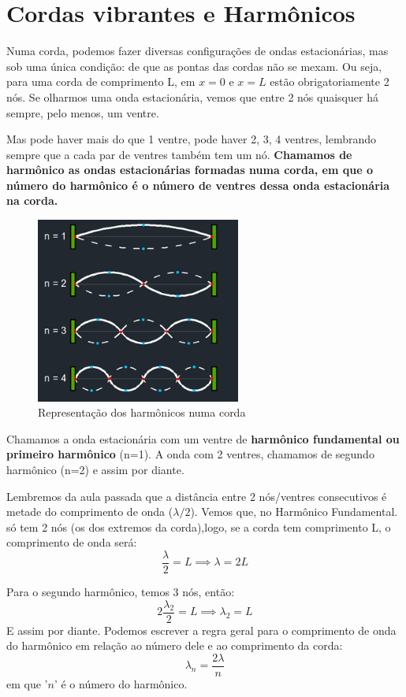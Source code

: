 \documentclass[12pt]{extarticle}
\newcommand{\<}{\langle}
\renewcommand{\>}{\rangle}
\theoremstyle{definition}
\begin{document}
\section{Cordas vibrantes e Harmônicos}
Numa corda, podemos fazer diversas configurações de ondas estacionárias, mas sob uma única condição: de que as pontas das cordas não se mexam. Ou seja, para uma corda de comprimento L, em $x=0$ e $x=L$ estão obrigatoriamente 2 nós. Se olharmos uma onda estacionária, vemos que entre 2 nós quaisquer há sempre, pelo menos, um ventre.

Mas pode haver mais do que 1 ventre, pode haver 2, 3, 4 ventres, lembrando sempre que a cada par de ventres também tem um nó. \textbf{Chamamos de harmônico as ondas estacionárias formadas numa corda, em que o número do harmônico é o número de ventres dessa onda estacionária na corda.}

\begin{figure}[H]
    \centering
    \includegraphics[width=0.6\textwidth]{harmonicos.png}
    \caption{Representação dos harmônicos numa corda}
    \label{fig:harmonicos}
\end{figure}

Chamamos a onda estacionária com um ventre de \textbf{harmônico fundamental ou primeiro harmônico} (n=1). A onda com 2 ventres, chamamos de segundo harmônico (n=2) e assim por diante.

Lembremos da aula passada que a distância entre 2 nós/ventres consecutivos é metade do comprimento de onda ($\lambda/2$). Vemos que, no Harmônico Fundamental. só tem 2 nós (os dos extremos da corda),logo, se a corda tem comprimento L, o comprimento de onda será:
\begin{equation}
    \frac{\lambda}{2}=L \implies \lambda= 2L
\end{equation}

Para o segundo harmônico, temos 3 nós, então:
\begin{equation}
    2\frac{\lambda_2}{2}=L \implies \lambda_2=L
\end{equation}
E assim por diante. Podemos escrever a regra geral para o comprimento de onda do harmônico em relação ao número dele e ao comprimento da corda:
\begin{equation}
    \lambda_n = \frac{2\lambda}{n}
\end{equation}
\noindent em que '$n$' é o número do harmônico.
\end{document}
